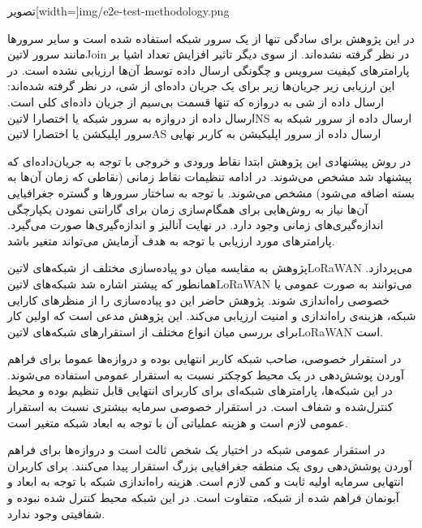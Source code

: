 ‌تصویر[width=\textwidth]{img/e2e-test-methodology.png}

در این پژوهش برای سادگی تنها از یک سرور شبکه استفاده شده است و سایر سرورها مانند سرور ‌لاتین{Join} در نظر گرفته نشده‌اند.
از سوی دیگر تاثیر افزایش تعداد اشیا بر پارامترهای کیفیت سرویس و چگونگی ارسال داده توسط آن‌ها ارزیابی نشده است.
در این ارزیابی زیر جریان‌ها زیر برای یک جریان داده‌ای از شی، در نظر گرفته شده‌اند:
 ارسال داده از شی به دروازه که تنها قسمت بی‌سیم از جریان داده‌ای کلی است.
 ارسال داده از دروازه به سرور شبکه یا اختصارا ‌لاتین{NS}
 ارسال داده از سرور شبکه به سرور اپلیکشن یا اختصارا ‌لاتین{AS}
 ارسال داده از سرور اپلیکیشن به کاربر نهایی

در روش پیشنهادی این پژوهش ابتدا نقاط ورودی و خروجی با توجه به جریان‌داده‌ای که پیشنهاد شد مشخص می‌شوند.
در ادامه تنظیمات نقاط زمانی (نقاطی که زمان آن‌ها به بسته اضافه می‌شود) مشخص می‌شوند.
با توجه به ساختار سرور‌ها و گستره جغرافیایی آن‌ها نیاز به روش‌هایی برای همگام‌سازی زمان برای گارانتی نمودن
یکپارچگی اندازه‌گیری‌های زمانی وجود دارد.
در نهایت آنالیز و اندازه‌گیری‌ها صورت می‌گیرد. پارامترهای مورد ارزیابی با توجه به هدف آزمایش می‌تواند متغیر باشد.



پژوهش  به مقایسه میان دو پیاده‌سازی مختلف از شبکه‌های ‌لاتین{LoRaWAN} می‌پردازد. همانطور که پیشتر اشاره شد شبکه‌های ‌لاتین{LoRaWAN} می‌توانند به صورت عمومی یا خصوصی
راه‌اندازی شوند. پژوهش حاضر این دو پیاده‌سازی را از منظرهای کارایی شبکه، هزینه‌ی راه‌اندازی و امنیت ارزیابی می‌کند. این پژوهش مدعی است که اولین کار برای بررسی میان انواع مختلف از استقرارهای شبکه‌های ‌لاتین{LoRaWAN}
است.

در استقرار خصوصی، صاحب شبکه کاربر انتهایی بوده و دروازه‌ها عموما برای فراهم آوردن پوشش‌دهی در یک محیط کوچکتر نسبت به استقرار عمومی استفاده می‌شوند.
در این شبکه‌ها، پارامترهای شبکه‌ای برای کاربرای انتهایی قابل تنظیم بوده و محیط کنترل‌شده و شفاف است. در استقرار خصوصی سرمایه بیشتری نسبت به استقرار عمومی لازم است و هزینه
عملیاتی آن با توجه به ابعاد شبکه متغیر است.

در استقرار عمومی شبکه در اختیار یک شخص ثالث است و دروازه‌ها برای فراهم آوردن پوشش‌دهی روی یک منطقه جغرافیایی بزرگ استقرار پیدا می‌کنند.
برای کاربران انتهایی سرمایه اولیه ثابت و کمی لازم است. هزینه راه‌اندازی شبکه با توجه به ابعاد و آبونمان فراهم شده از شبکه، متفاوت است.
در این شبکه محیط کنترل شده نبوده و شفافیتی وجود ندارد.

